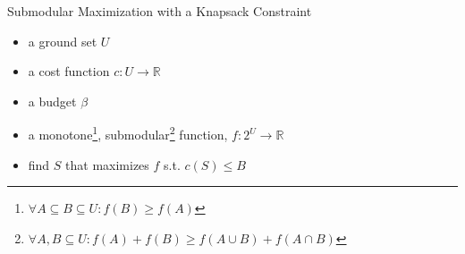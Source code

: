 \begin{frame}{Submodular Maximization with a Knapsack Constraint}
    \begin{itemize}
        \item a ground set $U$
        \item a cost function $c:U \to \mathbb{R}$
        \item a budget $\beta$
        \item a monotone\footnote{
                $\forall A \subseteq B \subseteq U: f(B) \geq f(A)$
            }, submodular\footnote{
                $\forall A, B \subseteq U: f(A) + f(B) \geq f(A \cup B) + f(A \cap B)$
            } function, $f:2^U \to \mathbb{R}$
        \item find $S$ that maximizes $f$ s.t. $c(S) \leq B$
    \end{itemize}
\end{frame}


